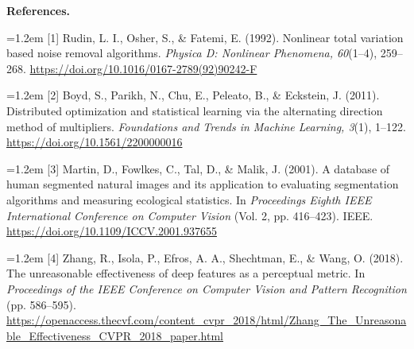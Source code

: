 \documentclass[10pt,letterpaper]{article}
\begin{document}
\vspace{2pt}
{\fontsize{8.5}{9.5}\selectfont
\textbf{References.}\par
\vspace{4pt}
\hangindent=1.2em [1] Rudin, L. I., Osher, S., \& Fatemi, E. (1992). Nonlinear total variation based noise removal algorithms. \textit{Physica D: Nonlinear Phenomena, 60}(1--4), 259--268. \url{https://doi.org/10.1016/0167-2789(92)90242-F}\par\vspace{1pt}
\hangindent=1.2em [2] Boyd, S., Parikh, N., Chu, E., Peleato, B., \& Eckstein, J. (2011). Distributed optimization and statistical learning via the alternating direction method of multipliers. \textit{Foundations and Trends in Machine Learning, 3}(1), 1--122. \url{https://doi.org/10.1561/2200000016}\par\vspace{1pt}
\hangindent=1.2em [3] Martin, D., Fowlkes, C., Tal, D., \& Malik, J. (2001). A database of human segmented natural images and its application to evaluating segmentation algorithms and measuring ecological statistics. In \textit{Proceedings Eighth IEEE International Conference on Computer Vision} (Vol. 2, pp. 416--423). IEEE. \url{https://doi.org/10.1109/ICCV.2001.937655}\par\vspace{1pt}
\hangindent=1.2em [4] Zhang, R., Isola, P., Efros, A. A., Shechtman, E., \& Wang, O. (2018). The unreasonable effectiveness of deep features as a perceptual metric. In \textit{Proceedings of the IEEE Conference on Computer Vision and Pattern Recognition} (pp. 586--595). \url{https://openaccess.thecvf.com/content_cvpr_2018/html/Zhang_The_Unreasonable_Effectiveness_CVPR_2018_paper.html}\par\vspace{1pt}
}
\end{document}

